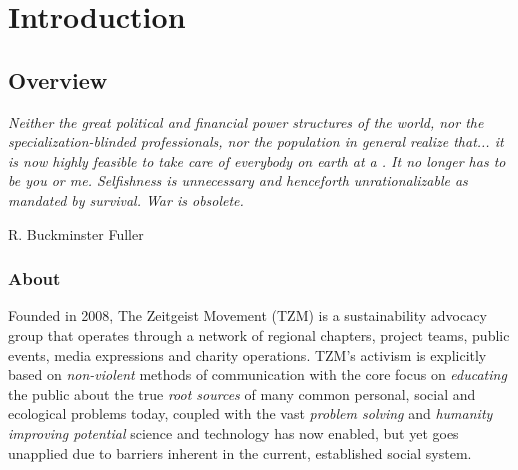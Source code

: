 \documentclass[10pt, a4paper, cleardoubleempty, openright, twoside]{book}
\begin{document}
\part {Introduction}

\chapter {Overview}
\epigraph{\itshape
	Neither the great political and financial power structures of the
	world, nor the specialization-blinded professionals, nor the
	population in general realize that... it is now highly feasible to
	take care of everybody on earth at a . It no longer has to be you or me.
	Selfishness is unnecessary and henceforth unrationalizable as mandated
	by survival.  War is obsolete. 
}{R. Buckminster Fuller~\cite[Introduction, p.~xxv]{Fuller::81}}

\section {About}

Founded in 2008, The Zeitgeist Movement (TZM) is a sustainability
advocacy group that operates through a network of regional chapters,
project teams, public events, media expressions and charity operations.
TZM's activism is explicitly based on \emph{non-violent} methods of
communication with the core focus on \emph{educating} the public about
the true \emph{root sources} of many common personal, social and
ecological problems today, coupled with the vast \emph{problem solving}
and \emph{humanity improving potential} science and technology has now
enabled, but yet goes unapplied due to barriers inherent in the current,
established social system.
\end{document}
